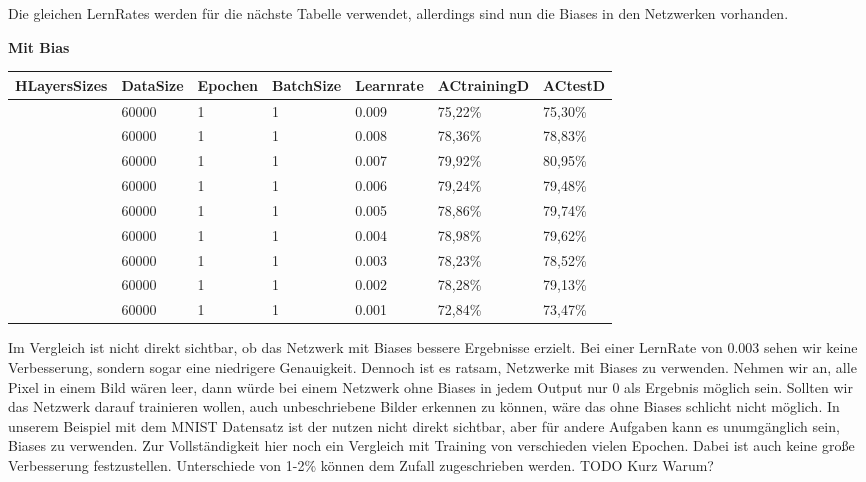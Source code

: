 \documentclass[12pt]{article}
\begin{document}
Die gleichen LernRates werden für die nächste Tabelle verwendet, allerdings sind nun die Biases in den Netzwerken vorhanden.

\begin{table}[H]
	\textbf{Mit Bias}
    \centering
    \begin{tabular}{|l|l|l|l|l|l|l|}
    \hline
        HLayersSizes & DataSize & Epochen & BatchSize & Learnrate & ACtrainingD & ACtestD \\ \hline
        [784, 100, 10] & 60000 & 1 & 1 & 0.009 & 75,22\% & 75,30\% \\ \hline
        [784, 100, 10] & 60000 & 1 & 1 & 0.008 & 78,36\% & 78,83\% \\ \hline
        [784, 100, 10] & 60000 & 1 & 1 & 0.007 & 79,92\% & 80,95\% \\ \hline
        [784, 100, 10] & 60000 & 1 & 1 & 0.006 & 79,24\% & 79,48\% \\ \hline
        [784, 100, 10] & 60000 & 1 & 1 & 0.005 & 78,86\% & 79,74\% \\ \hline
        [784, 100, 10] & 60000 & 1 & 1 & 0.004 & 78,98\% & 79,62\% \\ \hline
        [784, 100, 10] & 60000 & 1 & 1 & 0.003 & 78,23\% & 78,52\% \\ \hline
        [784, 100, 10] & 60000 & 1 & 1 & 0.002 & 78,28\% & 79,13\% \\ \hline
        [784, 100, 10] & 60000 & 1 & 1 & 0.001 & 72,84\% & 73,47\% \\ \hline
    \end{tabular}
\end{table}
Im Vergleich ist nicht direkt sichtbar, ob das Netzwerk mit Biases bessere Ergebnisse erzielt. Bei einer LernRate von 0.003 sehen wir keine Verbesserung, sondern sogar eine niedrigere Genauigkeit.
Dennoch ist es ratsam, Netzwerke mit Biases zu verwenden. Nehmen wir an, alle Pixel in einem Bild wären leer, dann würde bei einem Netzwerk ohne Biases in jedem Output nur 0 als Ergebnis möglich sein. Sollten wir das Netzwerk darauf trainieren wollen, auch unbeschriebene Bilder erkennen zu können, wäre das ohne Biases schlicht nicht möglich. In unserem Beispiel mit dem MNIST Datensatz ist der nutzen nicht direkt sichtbar, aber für andere Aufgaben kann es unumgänglich sein, Biases zu verwenden.
Zur Vollständigkeit hier noch ein Vergleich mit Training von verschieden vielen Epochen. Dabei ist auch keine große Verbesserung festzustellen. Unterschiede von 1-2\% können dem Zufall zugeschrieben werden. TODO Kurz Warum?
\end{document}
